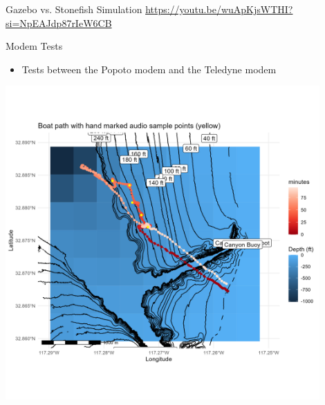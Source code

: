 \begin{frame}{Gazebo vs. Stonefish Simulation}
    \href{https://youtu.be/wuApKjsWTHI?si=NpEAJdp87rIeW6CB}{https://youtu.be/wuApKjsWTHI?si=NpEAJdp87rIeW6CB}
\end{frame}

\begin{frame}{Modem Tests}
     \begin{itemize}
         \item Tests between the Popoto modem and the Teledyne modem
     \end{itemize}    
     \centering
     \includegraphics[height=0.9\textheight,width=0.9\textwidth,keepaspectratio]{images/volt/path_test_high_res.png}
 \end{frame}



